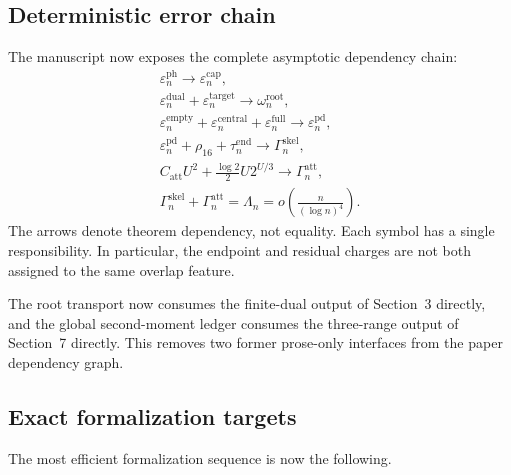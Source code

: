 \subsection{Deterministic error chain}

The manuscript now exposes the complete asymptotic dependency chain:
\[
\begin{gathered}
  \varepsilon_n^{\mathrm{ph}}
  \longrightarrow
  \varepsilon_n^{\mathrm{cap}},\\
  \varepsilon_n^{\mathrm{dual}}
  +\varepsilon_n^{\mathrm{target}}
  \longrightarrow
  \omega_n^{\mathrm{root}},\\
  \varepsilon_n^{\mathrm{empty}}
  +\varepsilon_n^{\mathrm{central}}
  +\varepsilon_n^{\mathrm{full}}
  \longrightarrow
  \varepsilon_n^{\mathrm{pd}},\\
  \varepsilon_n^{\mathrm{pd}}
  +\rho_{16}
  +\tau_n^{\mathrm{end}}
  \longrightarrow
  \Gamma_n^{\mathrm{skel}},\\
  C_{\mathrm{att}}U^2
  +\frac{\log 2}{2}U2^{U/3}
  \longrightarrow
  \Gamma_n^{\mathrm{att}},\\
  \Gamma_n^{\mathrm{skel}}
  +\Gamma_n^{\mathrm{att}}
  =\Lambda_n
  =o\!\left(\frac{n}{(\log n)^4}\right).
\end{gathered}
\]
The arrows denote theorem dependency, not equality. Each symbol has a single
responsibility. In particular, the endpoint and residual charges are not both
assigned to the same overlap feature.

The root transport now consumes the finite-dual output of Section~3 directly,
and the global second-moment ledger consumes the three-range output of
Section~7 directly. This removes two former prose-only interfaces from the
paper dependency graph.

\subsection{Exact formalization targets}

The most efficient formalization sequence is now the following.

